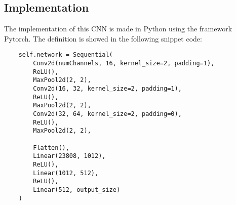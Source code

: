 \subsection{Implementation}

The implementation of this CNN is made in Python using the framework Pytorch. The definition is showed in the following snippet code:
\begin{lstlisting}
	self.network = Sequential(
		Conv2d(numChannels, 16, kernel_size=2, padding=1),
		ReLU(),
		MaxPool2d(2, 2),
		Conv2d(16, 32, kernel_size=2, padding=1),
		ReLU(),
		MaxPool2d(2, 2),
		Conv2d(32, 64, kernel_size=2, padding=0),
		ReLU(),
		MaxPool2d(2, 2),
		
		Flatten(),
		Linear(23808, 1012),
		ReLU(),
		Linear(1012, 512),
		ReLU(),
		Linear(512, output_size)
	)
\end{lstlisting}
